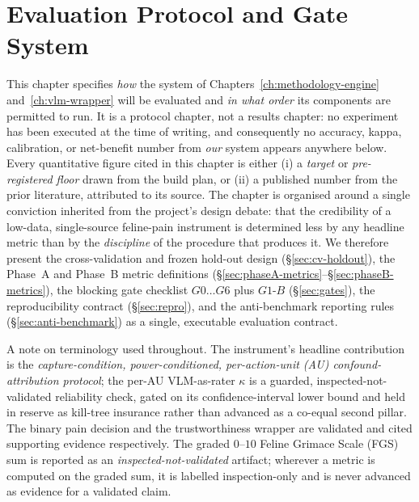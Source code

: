 \chapter{Evaluation Protocol and Gate System}
\label{ch:eval-protocol}

This chapter specifies \emph{how} the system of
Chapters~\ref{ch:methodology-engine} and~\ref{ch:vlm-wrapper} will be
evaluated and \emph{in what order} its components are permitted to run. It is a protocol
chapter, not a results chapter: no experiment has been executed at the time of writing, and
consequently no accuracy, kappa, calibration, or net-benefit number from \emph{our} system
appears anywhere below. Every quantitative figure cited in this chapter is either (i) a
\emph{target} or \emph{pre-registered floor} drawn from the build plan, or (ii) a published
number from the prior literature, attributed to its source. The chapter is organised around a
single conviction inherited from the project's design debate: that the credibility of a
low-data, single-source feline-pain instrument is determined less by any headline metric than
by the \emph{discipline} of the procedure that produces it. We therefore present the
cross-validation and frozen hold-out design (\S\ref{sec:cv-holdout}), the Phase~A and Phase~B
metric definitions (\S\ref{sec:phaseA-metrics}--\S\ref{sec:phaseB-metrics}), the blocking gate
checklist $G0\ldots G6$ plus $G1\text{-}B$ (\S\ref{sec:gates}), the reproducibility contract
(\S\ref{sec:repro}), and the anti-benchmark reporting rules (\S\ref{sec:anti-benchmark}) as a
single, executable evaluation contract.

A note on terminology used throughout. The instrument's headline contribution is the
\emph{capture-condition, power-conditioned, per-action-unit (AU) confound-attribution
protocol}; the per-AU VLM-as-rater $\kappa$ is a guarded, inspected-not-validated reliability
check, gated on its confidence-interval lower bound and held in reserve as kill-tree insurance
rather than advanced as a co-equal second pillar. The binary pain decision and the
trustworthiness wrapper are validated and cited supporting evidence respectively. The graded
$0\text{--}10$ Feline Grimace Scale (FGS) sum is reported as an
\emph{inspected-not-validated} artifact; wherever a metric is computed on the graded sum, it is
labelled inspection-only and is never advanced as evidence for a validated claim.


